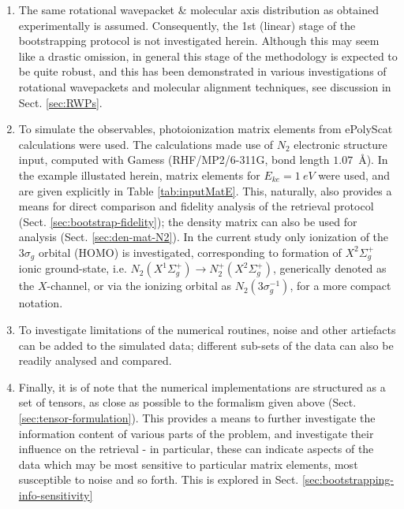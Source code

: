 \documentclass[10pt]{article}
\begin{document}
\begin{enumerate}
\item The same rotational wavepacket \& molecular axis distribution as obtained experimentally is assumed. Consequently, the 1st (linear) stage of the bootstrapping protocol is not investigated herein. Although this may seem like a drastic omission, in general this stage of the methodology is expected to be quite robust, and this has been demonstrated in various investigations of rotational wavepackets and molecular alignment techniques, see discussion in Sect. \ref{sec:RWPs}.
\item To simulate the observables, photoionization matrix elements from ePolyScat \cite{Lucchese1986, Gianturco1994, Natalense1999, luccheseEPolyScatUserManual} calculations were used. The calculations made use of $N_2$ electronic structure input, computed with Gamess \cite{gamess, Gordon} (RHF/MP2/6-311G, bond length $1.07$~\AA). In the example illustated herein, matrix elements for $E_{ke}=1~eV$ were used, and are given explicitly in Table \ref{tab:inputMatE}. This, naturally, also provides a means for direct comparison and fidelity analysis of the retrieval protocol (Sect. \ref{sec:bootstrap-fidelity}); the density matrix can also be used for analysis (Sect. \ref{sec:den-mat-N2}). In the current study only ionization of the $3\sigma_g$ orbital (HOMO) is investigated, corresponding to formation of  $X^2\Sigma_{g}^{+}$ ionic ground-state, i.e. $N_2(X^{1}\Sigma^{+}_{g}) \rightarrow N^+_2(X^{2}\Sigma^{+}_{g})$, generically denoted as the $X$-channel, or via the ionizing orbital as $N_2(3\sigma_g^{-1})$, for a more compact notation. 
\item To investigate limitations of the numerical routines, noise and other artiefacts can be added to the simulated data; different sub-sets of the data can also be readily analysed and compared.
\item Finally, it is of note that the numerical implementations are structured as a set of tensors, as close as possible to the formalism given above (Sect. \ref{sec:tensor-formulation}). This provides a means to further investigate the information content of various parts of the problem, and investigate their influence on the retrieval - in particular, these can indicate aspects of the data which may be most sensitive to particular matrix elements, most susceptible to noise and so forth. This is explored in Sect. \ref{sec:bootstrapping-info-sensitivity}
\end{enumerate}
\end{document}
